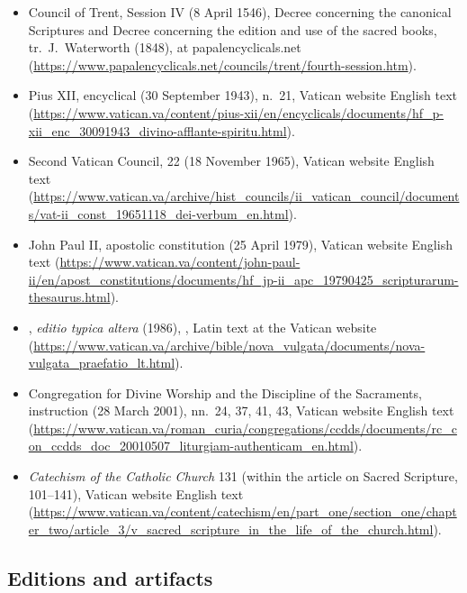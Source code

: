 \begin{itemize}
\item Council of Trent, Session IV (8 April 1546), Decree concerning the
canonical Scriptures and Decree concerning the edition and use of the
sacred books, tr.\ J.~Waterworth (1848), at papalencyclicals.net
(\url{https://www.papalencyclicals.net/councils/trent/fourth-session.htm}).
\item Pius XII, encyclical  (30 September
1943), n.~21, Vatican website English text
(\url{https://www.vatican.va/content/pius-xii/en/encyclicals/documents/hf_p-xii_enc_30091943_divino-afflante-spiritu.html}).
\item Second Vatican Council,  22 (18 November 1965),
Vatican website English text
(\url{https://www.vatican.va/archive/hist_councils/ii_vatican_council/documents/vat-ii_const_19651118_dei-verbum_en.html}).
\item John Paul II, apostolic constitution 
(25 April 1979), Vatican website English text
(\url{https://www.vatican.va/content/john-paul-ii/en/apost_constitutions/documents/hf_jp-ii_apc_19790425_scripturarum-thesaurus.html}).
\item {}, \textit{editio
typica altera} (1986), , Latin text at the
Vatican website
(\url{https://www.vatican.va/archive/bible/nova_vulgata/documents/nova-vulgata_praefatio_lt.html}).
\item Congregation for Divine Worship and the Discipline of the
Sacraments, instruction  (28 March 2001),
nn.~24, 37, 41, 43, Vatican website English text
(\url{https://www.vatican.va/roman_curia/congregations/ccdds/documents/rc_con_ccdds_doc_20010507_liturgiam-authenticam_en.html}).
\item \textit{Catechism of the Catholic Church} 131 (within the article
on Sacred Scripture, 101--141), Vatican website English text
(\url{https://www.vatican.va/content/catechism/en/part_one/section_one/chapter_two/article_3/v_sacred_scripture_in_the_life_of_the_church.html}).
\end{itemize}

\subsection*{Editions and artifacts}

